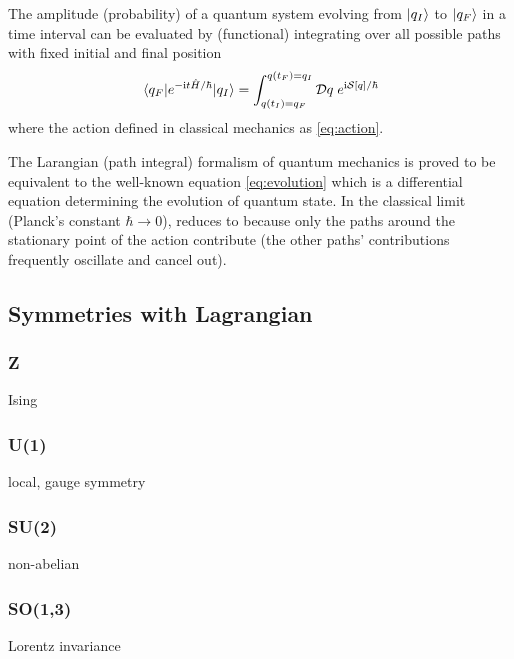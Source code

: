 \begin{axiom}\label{thm:path_integral}
    The amplitude (probability) of a quantum system evolving from $\ket{q_I}$ to $\ket{q_F}$ in a time interval can be evaluated by (functional) integrating over all possible paths with fixed initial and final position 
    \begin{equation}
		\mel{q_F}{e^{-\textup{i}t\hat{H}/\hbar}}{q_I} =
        \int_{q(t_I)= q_F}^{q(t_F)=q_I} \mathcal{D} q \; e^{\textup{i} \mathcal{S}[q]/\hbar}
    \end{equation}
	where the action defined in classical mechanics as \cref{eq:action}.
\end{axiom}
The Larangian (path integral) formalism of quantum mechanics is proved to be equivalent to the well-known \schrodinger equation \cref{eq:evolution} \cite[Chp4]{feynmanQuantumMechanicsPath2010} 
which is a differential equation determining the evolution of quantum state.
In the classical limit (Planck's constant $\hbar\to 0$),  reduces to 
because only the paths around the stationary point of the action contribute 
(the other paths' contributions frequently oscillate and cancel out).

\subsection{Symmetries with Lagrangian}
\subsubsection{Z}
Ising

\subsubsection{U(1)}
local, gauge symmetry

\subsubsection{SU(2)}
non-abelian

\subsubsection{SO(1,3)}
Lorentz invariance